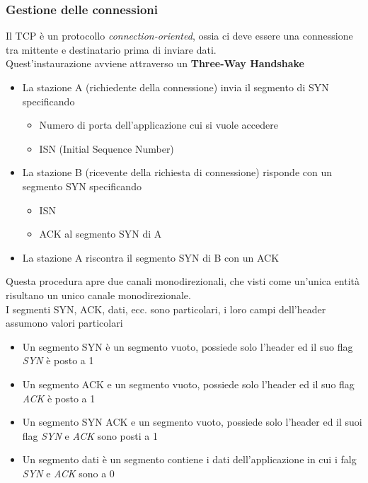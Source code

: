\documentclass{article}
\newcounter{subsubsubsection}[subsubsection]
\begin{document}
            \subsubsection{Gestione delle connessioni}
                    Il TCP è un protocollo \textit{connection-oriented}, ossia ci deve essere una connessione tra mittente e destinatario prima di inviare dati.\\
                    Quest'instaurazione avviene attraverso un \textbf{Three-Way Handshake}
                    \begin{itemize}
                        \item La stazione A (richiedente della connessione) invia il segmento di SYN specificando
                              \begin{itemize}
                                  \item Numero di porta dell'applicazione cui si vuole accedere
                                  \item ISN (Initial Sequence Number)
                              \end{itemize}
                        \item La stazione B (ricevente della richiesta di connessione) risponde con un segmento SYN specificando
                              \begin{itemize}
                                  \item ISN
                                  \item ACK al segmento SYN di A
                              \end{itemize}
                        \item La stazione A riscontra il segmento SYN di B con un ACK
                    \end{itemize}
                    Questa procedura apre due canali monodirezionali, che visti come un'unica entità risultano un unico canale monodirezionale.\\
                    I segmenti SYN, ACK, dati, ecc. sono particolari, i loro campi dell'header assumono valori particolari
                    \begin{itemize}
                        \item Un segmento SYN è un segmento vuoto, possiede solo l'header ed il suo flag \textit{SYN} è posto a 1
                        \item Un segmento ACK e un segmento vuoto, possiede solo l'header ed il suo flag \textit{ACK} è posto a 1
                        \item Un segmento SYN ACK e un segmento vuoto, possiede solo l'header ed il suoi flag \textit{SYN} e \textit{ACK} sono posti a 1
                        \item Un segmento dati è un segmento contiene i dati dell'applicazione in cui i falg \textit{SYN} e \textit{ACK} sono a 0 
                    \end{itemize}
\end{document}
